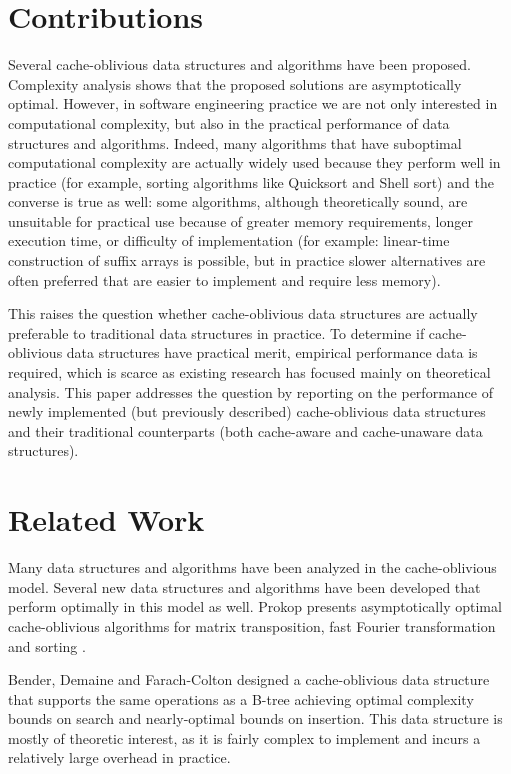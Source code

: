 \documentclass{acm_proc_article-sp}
\begin{document}
\section{Contributions}
Several cache-oblivious data structures and algorithms have been proposed. Complexity analysis shows that the proposed solutions are asymptotically optimal. However, in software engineering practice we are not only interested in computational complexity, but also in the practical performance of data structures and algorithms. Indeed, many algorithms that have suboptimal computational complexity are actually widely used because they perform well in practice (for example, sorting algorithms like Quicksort and Shell sort) and the converse is true as well: some algorithms, although theoretically sound, are unsuitable for practical use because of greater memory requirements, longer execution time, or difficulty of implementation (for example: linear-time construction of suffix arrays is possible, but in practice slower alternatives are often preferred that are easier to implement and require less memory).

This raises the question whether cache-oblivious data structures are actually preferable to traditional data structures in practice. To determine if cache-oblivious data structures have practical merit, empirical performance data is required, which is scarce as existing research has focused mainly on theoretical analysis. This paper addresses the question by reporting on the performance of newly implemented (but previously described) cache-oblivious data structures and their traditional counterparts (both cache-aware and cache-unaware data structures).

\section{Related Work}
Many data structures and algorithms have been analyzed in the cache-oblivious model. Several new data structures and algorithms have been developed that perform optimally in this mo\-del as well. Prokop presents asymptotically optimal cache-oblivious algorithms for matrix transposition, fast Fourier transformation and sorting \cite{prokop1999coa}.

Bender, Demaine and Farach-Colton designed a cache-oblivious data structure that supports the same operations as a B-tree \cite{bender2005cob} achieving optimal complexity bounds on search and nearly-optimal bounds on insertion. This data structure is mostly of theoretic interest, as it is fairly complex to implement and incurs a relatively large overhead in practice.
\end{document}
